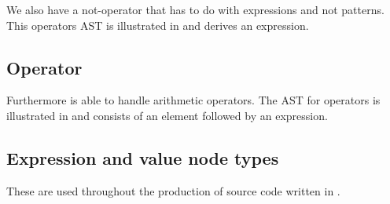 We also have a not-operator that has to do with expressions and not patterns. This operators AST is illustrated in  and derives an expression.%

%

\subsection{Operator}%

Furthermore \productname{} is able to handle arithmetic operators. The AST for operators is illustrated in  and consists of an element followed by an expression.%

%


\subsection{Expression and value node types}

These are used throughout the production of source code written in \productname{}.

%
%
%
%
%
%
%

